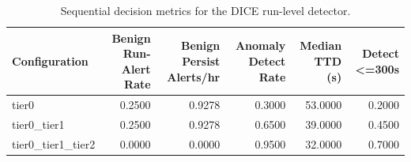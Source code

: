 \begin{table}[t]
\centering
\caption{Sequential decision metrics for the DICE run-level detector.}
\label{tab:dice_sequential_metrics}
\footnotesize
\begin{tabular}{lrrrrr}
\toprule
Configuration & Benign Run-Alert Rate & Benign Persist Alerts/hr & Anomaly Detect Rate & Median TTD (s) & Detect <=300s \\
\midrule
tier0 & 0.2500 & 0.9278 & 0.3000 & 53.0000 & 0.2000 \\
tier0_tier1 & 0.2500 & 0.9278 & 0.6500 & 39.0000 & 0.4500 \\
tier0_tier1_tier2 & 0.0000 & 0.0000 & 0.9500 & 32.0000 & 0.7000 \\
\bottomrule
\end{tabular}

\end{table}
